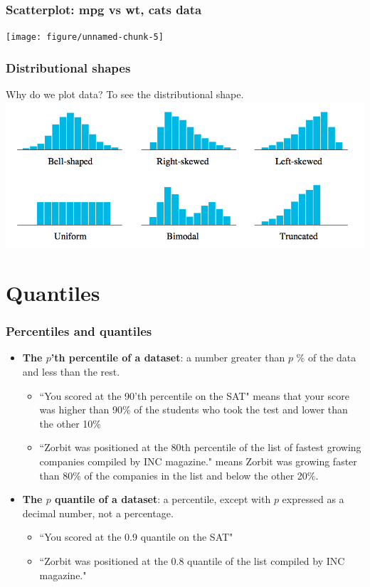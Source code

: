 \documentclass[handout]{beamer}\usepackage{graphicx, color}
\newenvironment{knitrout}{}{} %
\providecommand{\q}{$\quad$ \newline}
\numberwithin{equation}{section}
\begin{document}
\begin{frame}[fragile]
\frametitle{Scatterplot: mpg vs wt, cats data}
\begin{knitrout}
\color{fgcolor}
\texttt{[image: figure/unnamed-chunk-5]} 

\end{knitrout}

\end{frame}

\begin{frame}
\frametitle{Distributional shapes}
Why do we plot data? To see the distributional shape. \q
{} \includegraphics{../../fig/distshapes.png}
\end{frame}

\section{Quantiles}

\begin{frame}
\frametitle{Percentiles and quantiles}
\begin{itemize}
\item {\bf The $p$'th percentile of a dataset}: a number greater than $p$ \% of the data and less than the rest.
\begin{itemize}
\pause \item ``You scored at the 90'th percentile on the SAT" means that your score was higher than 90\% of the students who took the test and lower than the other 10\%
\pause \item ``Zorbit was positioned at the 80th percentile of the list of fastest growing companies compiled by INC magazine." means Zorbit was growing faster than 80\% of the companies in the list and below the other 20\%. 
\end{itemize}
\pause \item {\bf The $p$ quantile of a dataset}: a percentile, except with $p$ expressed as a decimal number, not a percentage.
\begin{itemize}
\pause \item ``You scored at the 0.9 quantile on the SAT" 
\pause \item ``Zorbit was positioned at the 0.8 quantile of the list compiled by INC magazine."
\end{itemize}
\end{itemize}
\end{frame}
\end{document}
